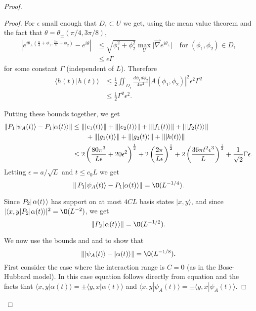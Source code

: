 \documentclass[../thesis-main/thesis-main]{subfiles}
\begin{document}
\begin{proof}
\begin{proof}
For $\epsilon$ small enough that $D_\epsilon\subset U$ we get, using the mean value theorem and the fact that $\theta=\theta_\pm ({\pi}/{4}, {3\pi}/{8})$,
\begin{align*}
\left|e^{i\theta_\pm (\tfrac{\pi}{4}+\phi_{1}, \tfrac{3\pi}{8}+\phi_{2})}-e^{i\theta}\right| & \leq \sqrt{\phi_1^2+\phi_2^2} \max_{U} \big|\vec{\nabla} e^{i\theta_\pm}\big| \quad \text{for }(\phi_1,\phi_2)\in D_{\epsilon}\\
& \leq  \epsilon \Gamma
\end{align*}
for some constant $\Gamma$ (independent of $L$).
Therefore
\begin{align*}
\langle h(t)|h(t)\rangle & \leq  \frac{1}{2}\iint_{D_{\epsilon}}\frac{d\phi_{1}d\phi_{2}}{4\pi^{2}}
	\left|A(\phi_{1},\phi_{2})\right|^{2} \epsilon^2 \Gamma^2\\
& \leq \frac{1}{2}\Gamma^2 \epsilon^2.
\end{align*}
 
Putting these bounds together, we get 
\begin{align*}
\left\|{P_1|\psi_A(t)\rangle-P_1|\alpha(t)\rangle}\right\|  
 & \leq \|{|e_{1}(t)\rangle}\| + \|{|e_{2}(t)\rangle}\| + 
        \|{|f_{1}(t)\rangle}\| + \|{|f_{2}(t)\rangle}\| \\
 &  \qquad + \|{|g_{1}(t)\rangle}\| + \|{|g_{2}(t)\rangle}\| 
           + \|{|h(t)\rangle}\| \\
 & \leq 2\left(\frac{80\pi^{3}}{L\epsilon}+20\epsilon^{2}\right)^{\frac{1}{2}}
 	+2\left(\frac{2\pi}{L\epsilon}\right)^{\frac{1}{2}}+2\left(\frac{36\pi t^{2}\epsilon^{3}}{L}\right)^{\frac{1}{2}}+\frac{1}{\sqrt{2}}\Gamma \epsilon.
\end{align*}
 Letting $\epsilon={a}/{\sqrt{L}}$ and $t\leq c_{0}L$ we get 
\begin{equation}
\left\Vert \,P_1|\psi_A(t)\rangle-P_1|\alpha(t)\rangle\right\Vert = \O(L^{-{1}/{4}}).\label{eq:psiA_alpha}
\end{equation}

Since $P_2|\mspace{2mu} \alpha(t) \mspace{2mu} \rangle$ has support on at most $4CL$ basis states $|x,y\rangle$, and since $|\langle x,y|P_2|\alpha(t)\rangle|^2=\O( L^{-2})$, we get
\begin{equation}
  \left\Vert P_2\ket{\alpha(t)}\right\Vert = \O(L^{-{1}/{2}}).\label{eq:P2alpha_bound}
\end{equation}

We now use the bounds  and  and  to show that
\begin{equation}
\left\Vert |\psi_{A}(t)\rangle-|\alpha(t)\rangle\right\Vert =\O(L^{-{1}/{8}}).\label{eq:psiA_alpha_bound}\end{equation}
 First consider the case where the interaction range is $C=0$ (as in
the Bose-Hubbard model). In this case equation 
follows directly from equation  and the facts that
$\langle x,y|\alpha(t)\rangle=\pm\langle y,x|\alpha(t)\rangle$ and
$\langle x,y|\psi_{A}(t)\rangle=\pm\langle y,x|\psi_{A}(t)\rangle$. 


\end{proof}
\end{proof}
\end{document}
